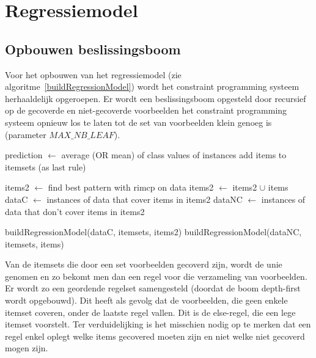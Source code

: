 \documentclass[a4paper,dutch,11pt,]{article}
\begin{document}


\section{Regressiemodel}

\subsection{Opbouwen beslissingsboom}
Voor het opbouwen van het regressiemodel (zie algoritme~\ref{buildRegressionModel}) wordt het constraint programming systeem herhaaldelijk opgeroepen. Er wordt een beslissingsboom opgesteld door recursief op de gecoverde en niet-gecoverde voorbeelden het constraint programming systeem opnieuw los te laten tot de set van voorbeelden klein genoeg is (parameter $MAX\_NB\_LEAF$). 


\begin{algorithm}[hbpt]
\caption{buildRegressionModel(data, itemsets, items)}
\label{buildRegressionModel}

{
    prediction $\leftarrow$ average (OR mean) of class values of instances\;
    add items to itemsets (as last rule)\;    
}
{
items2 $\leftarrow$ find best pattern with rimcp on data\;
items2 $\leftarrow$ items2 $\cup$ items\;
dataC $\leftarrow$ instances of data that cover items in items2\; 
dataNC $\leftarrow$ instances of data that don't cover items in items2\; 

buildRegressionModel(dataC, itemsets, items2)\;
buildRegressionModel(dataNC, itemsets, items)\;
}
\end{algorithm}


Van de itemsets die door een set voorbeelden gecoverd zijn, wordt de unie genomen en zo bekomt men dan een regel voor die verzameling van voorbeelden. Er wordt zo een geordende regelset samengesteld (doordat de boom depth-first wordt opgebouwd). Dit heeft als gevolg dat de voorbeelden, die geen enkele itemset coveren, onder de laatste regel vallen. Dit is de else-regel, die een lege itemset voorstelt. Ter verduidelijking is het misschien nodig op te merken dat een regel enkel oplegt welke items gecovered moeten zijn en niet welke niet gecoverd mogen zijn.
\end{document}
